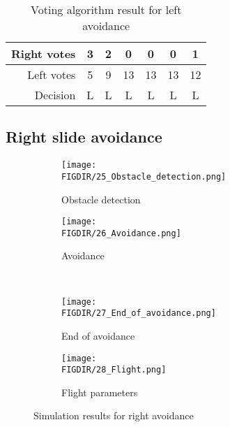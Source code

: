 \begin{table}[H]
    \centering
    \begin{tabular}{|r||c|c|c|c|c|c|}
        \hline
        Right votes & 3 & 2 & 0  & 0  & 0  & 1\\ 
        \hline
        Left votes  & 5 & 9 & 13 & 13 & 13 & 12\\
        \hline
        \hline
        Decision    & L & L & L  & L  & L  & L\\
        \hline
    \end{tabular}
    \caption{Voting algorithm result for left avoidance}
    \label{tab:avoidanceleft}
\end{table}


\subsection{Right slide avoidance} 
\begin{figure}[H]
    \begin{subfigure}{0.5\textwidth}
    \texttt{[image: \\FIGDIR/25\_Obstacle\_detection.png]} 
    \caption{Obstacle detection}
    \label{fig:25Obstacledetection}
    \end{subfigure}
    \begin{subfigure}{0.5\textwidth}
    \texttt{[image: \\FIGDIR/26\_Avoidance.png]}
    \caption{Avoidance}
    \label{fig:26Avoidance}
    \end{subfigure}
    \\
    \begin{subfigure}{0.5\textwidth}
    \texttt{[image: \\FIGDIR/27\_End\_of\_avoidance.png]} 
    \caption{End of avoidance}
    \label{fig:27Endofavoidance}
    \end{subfigure}
    \begin{subfigure}{0.5\textwidth}
    \texttt{[image: \\FIGDIR/28\_Flight.png]}
    \caption{Flight parameters}
    \label{fig:28Flightparameters}
    \end{subfigure}
\caption{Simulation results for right avoidance}
\label{fig:SimulationRight}
\end{figure}

